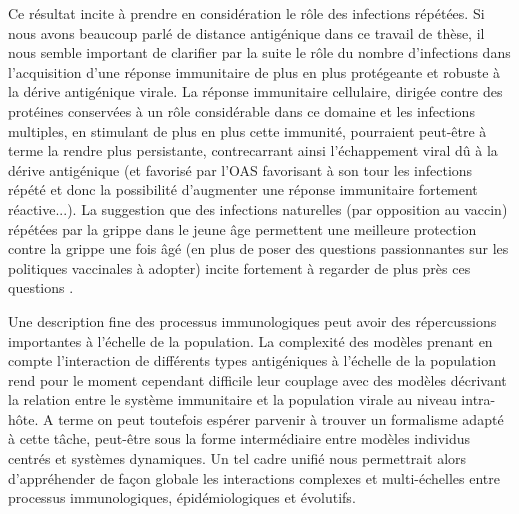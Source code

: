 Ce résultat incite à prendre en considération le rôle des infections
répétées. Si nous avons beaucoup parlé de distance antigénique dans ce
travail de thèse, il nous semble important de clarifier par la suite
le rôle du nombre d'infections dans l'acquisition d'une réponse
immunitaire de plus en plus protégeante et robuste à la dérive
antigénique virale. La réponse immunitaire cellulaire, dirigée contre
des protéines conservées à un rôle considérable dans ce domaine et les
infections multiples, en stimulant de plus en plus cette immunité,
pourraient peut-être à terme la rendre plus persistante, contrecarrant
ainsi l'échappement viral dû à la dérive antigénique (et favorisé par
l'OAS favorisant à son tour les infections répété et donc la
possibilité d'augmenter une réponse immunitaire fortement
réactive...). La suggestion que des infections naturelles (par
opposition au vaccin) répétées par la grippe dans le jeune âge
permettent une meilleure protection contre la grippe une fois âgé (en
plus de poser des questions passionnantes sur les politiques
vaccinales à adopter) incite fortement à regarder de plus près ces
questions \citep{Carrat2006a}.


\vspace{2cm} 

Une description fine des processus immunologiques peut avoir des
répercussions importantes à l'échelle de la population. La complexité
des modèles prenant en compte l'interaction de différents types
antigéniques à l'échelle de la population rend pour le moment
cependant difficile leur couplage avec des modèles décrivant la
relation entre le système immunitaire et la population virale au
niveau intra-hôte. A terme on peut toutefois espérer parvenir à
trouver un formalisme adapté à cette tâche, peut-être sous la forme
intermédiaire entre modèles individus centrés et systèmes dynamiques.
Un tel cadre unifié nous permettrait alors d'appréhender de façon
globale les interactions complexes et multi-échelles entre processus
immunologiques, épidémiologiques et évolutifs.


